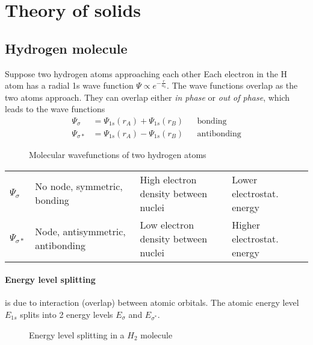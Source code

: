 \section{Theory of solids}

\subsection{Hydrogen molecule}
Suppose two hydrogen atoms approaching each other
Each electron in the H atom has a radial 1s wave function $\varPsi \propto e^{-\frac{r}{a_0}}$.
The wave functions overlap as the two atoms approach.
They can overlap either \emph{in phase} or \emph{out of phase}, which leads to the wave functions
\begin{align}
    \varPsi_{\sigma} &= \varPsi_{1s}(r_A) + \varPsi_{1s}(r_B) && \text{bonding} \\
    \varPsi_{\sigma *} &= \varPsi_{1s}(r_A) - \varPsi_{1s}(r_B) && \text{antibonding}
\end{align}

\begin{figure}[ht!]
    \centering
    
    \caption{Molecular wavefunctions of two hydrogen atoms}
\end{figure}

\begin{table}[ht!]
    \centering
    \begin{tabularx}{0.8\linewidth}{lXXX}
    \toprule
    $\varPsi_{\sigma}$ & No node, symmetric, bonding & High electron density between nuclei & Lower electrostat. energy \\
    $\varPsi_{\sigma *}$ & Node, antisymmetric, antibonding & Low electron density between nuclei & Higher electrostat. energy \\ 
    \bottomrule
    \end{tabularx}
\end{table}

\paragraph{Energy level splitting} 
is due to interaction (overlap) between atomic orbitals.
The atomic energy level $E_{1s}$ splits into 2 energy levels $E_{\sigma}$ and $E_{\sigma^*}$.

\begin{figure}[ht!]
    \centering
    
    \caption{Energy level splitting in a $H_2$ molecule}
\end{figure}

